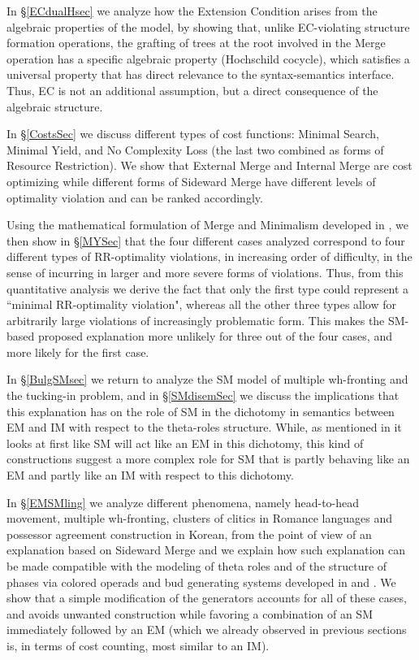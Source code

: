 \documentclass[12pt]{amsart}
\numberwithin{equation}{section}
\begin{document}
\smallskip

In \S \ref{ECdualHsec} we analyze how the Extension Condition
arises from the algebraic properties of the model, by showing that,
unlike EC-violating structure formation operations, the grafting 
of trees at the root involved in the Merge operation has a specific
algebraic property (Hochschild cocycle), which satisfies a universal
property that has direct relevance to the syntax-semantics interface.
Thus, EC is not an additional assumption, but a direct consequence of
the algebraic structure.

\smallskip

In \S \ref{CostsSec} we discuss different types of cost functions:
Minimal Search, Minimal Yield, and No Complexity Loss (the last
two combined as forms of Resource Restriction). We show that
External Merge and Internal Merge are cost optimizing while
different forms of Sideward Merge have different levels of
optimality violation and can be ranked accordingly. 

\smallskip

Using the mathematical formulation of Merge and Minimalism 
developed in \cite{MCB}, we then show in \S \ref{MYSec} that the four different cases
analyzed correspond to four different types of RR-optimality
violations, in increasing order of difficulty, in the sense of
incurring in larger and more severe forms of violations. Thus,
from this quantitative analysis we derive the fact that only
the first type could represent a ``minimal RR-optimality violation",
whereas all the other three types allow for arbitrarily large violations
of increasingly problematic form. This makes the SM-based
proposed explanation more unlikely for three out of the four cases,
and more likely for the first case. 

\smallskip

In \S \ref{BulgSMsec} we return to analyze the SM model
of multiple wh-fronting and the tucking-in problem, and in
\S \ref{SMdisemSec}
we discuss the implications that this explanation has on 
the role of SM in the dichotomy in semantics between EM and IM
with respect to the theta-roles structure. While, as mentioned
in \cite{MarLar} it looks at first like SM will act like an EM in this
dichotomy, this kind of constructions suggest a more complex
role for SM that is partly behaving like an EM and partly like an IM
with respect to this dichotomy.

\smallskip

In \S \ref{EMSMling} we analyze different phenomena, namely
head-to-head movement, multiple wh-fronting,
clusters of clitics in Romance languages and possessor agreement 
construction in Korean, from the point of view of an explanation
based on Sideward Merge and we explain how such explanation
can be made compatible with the modeling of theta roles and
of the structure of phases via colored operads and bud generating
systems developed in \cite{MarLar} and \cite{MHL}. We show that
a simple modification of the generators accounts for all of these
cases, and avoids unwanted construction while favoring a
combination of an SM immediately followed by an EM (which we
already observed in previous sections is, in terms of cost
counting, most similar to an IM). 
\end{document}
